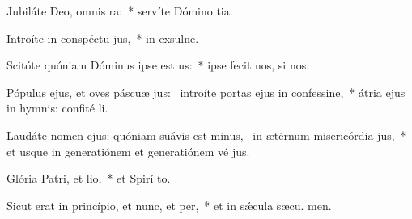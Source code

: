 \item Jubiláte Deo, omnis ra:~* servíte Dómino  tia.
\item Introíte in conspéctu jus,~* in exsulne.
\item Scitóte quóniam Dóminus ipse est us:~* ipse fecit nos,   si nos.
\item Pópulus ejus, et oves páscuæ jus:~\pscross{} introíte portas ejus in confessine,~* átria ejus in hymnis: confité li.
\item Laudáte nomen ejus: quóniam suávis est minus,~\pscross{} in ætérnum misericórdia jus,~* et usque in generatiónem et generatiónem vé jus.
\item Glória Patri, et lio,~* et Spirí to.
\item Sicut erat in princípio, et nunc, et per,~* et in sǽcula sæcu. men.
